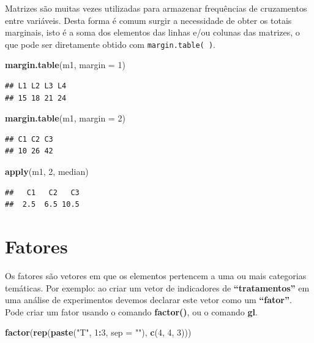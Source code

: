 \documentclass[]{book}
\newenvironment{Shaded}{\begin{snugshade}}{\end{snugshade}}
\newcommand{\DataTypeTok}[1]{\textcolor[rgb]{0.13,0.29,0.53}{#1}}
\newcommand{\DecValTok}[1]{\textcolor[rgb]{0.00,0.00,0.81}{#1}}
\newcommand{\KeywordTok}[1]{\textcolor[rgb]{0.13,0.29,0.53}{\textbf{#1}}}
\newcommand{\NormalTok}[1]{#1}
\newcommand{\OperatorTok}[1]{\textcolor[rgb]{0.81,0.36,0.00}{\textbf{#1}}}
\newcommand{\StringTok}[1]{\textcolor[rgb]{0.31,0.60,0.02}{#1}}
\begin{document}
Matrizes são muitas vezes utilizadas para armazenar frequências de cruzamentos entre variáveis. Desta forma é comum surgir a necessidade de obter os totais marginais, isto é a soma dos elementos das linhas e/ou colunas das matrizes, o que pode ser diretamente obtido com \texttt{margin.table(\ )}.

\begin{Shaded}
\begin{Highlighting}[]
 \KeywordTok{margin.table}\NormalTok{(m1, }\DataTypeTok{margin =} \DecValTok{1}\NormalTok{)}
\end{Highlighting}
\end{Shaded}

\begin{verbatim}
## L1 L2 L3 L4 
## 15 18 21 24
\end{verbatim}

\begin{Shaded}
\begin{Highlighting}[]
 \KeywordTok{margin.table}\NormalTok{(m1, }\DataTypeTok{margin =} \DecValTok{2}\NormalTok{)}
\end{Highlighting}
\end{Shaded}

\begin{verbatim}
## C1 C2 C3 
## 10 26 42
\end{verbatim}

\begin{Shaded}
\begin{Highlighting}[]
 \KeywordTok{apply}\NormalTok{(m1, }\DecValTok{2}\NormalTok{, median)}
\end{Highlighting}
\end{Shaded}

\begin{verbatim}
##   C1   C2   C3 
##  2.5  6.5 10.5
\end{verbatim}

\hypertarget{fatores}{%
\section{Fatores}\label{fatores}}

Os fatores são vetores em que os elementos pertencem a uma ou mais categorias temáticas. Por exemplo: ao criar um vetor de indicadores de \textbf{``tratamentos''} em uma análise de experimentos devemos declarar este vetor como um \textbf{``fator''}.
Pode criar um fator usando o comando \textbf{factor()}, ou o comando \textbf{gl}.

\begin{Shaded}
\begin{Highlighting}[]
\KeywordTok{factor}\NormalTok{(}\KeywordTok{rep}\NormalTok{(}\KeywordTok{paste}\NormalTok{(}\StringTok{"T"}\NormalTok{, }\DecValTok{1}\OperatorTok{:}\DecValTok{3}\NormalTok{, }\DataTypeTok{sep =} \StringTok{""}\NormalTok{), }\KeywordTok{c}\NormalTok{(}\DecValTok{4}\NormalTok{, }\DecValTok{4}\NormalTok{, }\DecValTok{3}\NormalTok{)))}
\end{Highlighting}
\end{Shaded}
\end{document}
